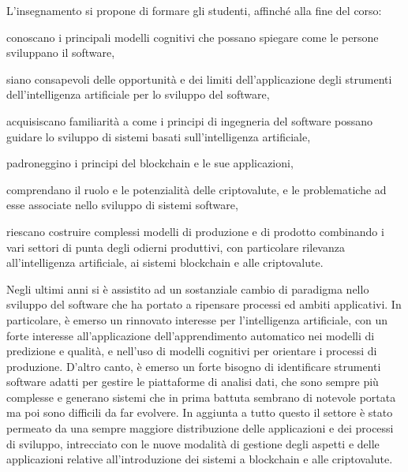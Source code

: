 \documentclass[11pt, a4paper]{article}
\begin{document}
\noindent
L'insegnamento si propone di formare gli studenti, affinché alla fine del corso:
\begin{borderedsquare}
\item conoscano i principali modelli cognitivi che possano spiegare come le persone sviluppano il software,
\item siano consapevoli delle opportunità e dei limiti dell’applicazione degli strumenti dell’intelligenza artificiale per lo sviluppo del software,
\item acquisiscano familiarità a come i principi di ingegneria del software possano guidare lo sviluppo di sistemi basati sull’intelligenza artificiale,
\item padroneggino i principi del blockchain e le sue applicazioni,
\item comprendano il ruolo e le potenzialità delle criptovalute, e le problematiche ad esse associate nello sviluppo di sistemi software,
\item riescano costruire complessi modelli di produzione e di prodotto combinando i vari settori di punta degli odierni produttivi, con particolare rilevanza all’intelligenza artificiale, ai sistemi blockchain e alle criptovalute.
\end{borderedsquare}


\noindent
Negli ultimi anni si è assistito ad un sostanziale cambio di paradigma nello sviluppo del software che ha portato a ripensare processi ed ambiti applicativi. In particolare, è emerso un rinnovato interesse per l’intelligenza artificiale, con un forte interesse all’applicazione dell’apprendimento automatico nei modelli di predizione e qualità, e nell’uso di modelli cognitivi per orientare i processi di produzione. D’altro canto, è emerso un forte bisogno di identificare strumenti software adatti per gestire le piattaforme di analisi dati, che sono sempre più complesse e generano sistemi che in prima battuta sembrano di notevole portata ma poi sono difficili da far evolvere. In aggiunta a tutto questo il settore è stato permeato da una sempre maggiore distribuzione delle applicazioni e dei processi di sviluppo, intrecciato con le nuove modalità di gestione degli aspetti e delle applicazioni relative all’introduzione dei sistemi a blockchain e alle criptovalute.
\end{document}
